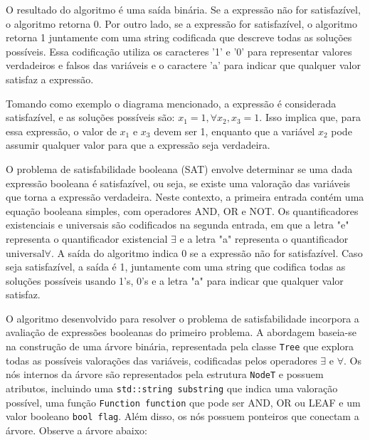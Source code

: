 \documentclass{article}
\begin{document}
O resultado do algoritmo é uma saída binária. Se a expressão não for satisfazível, o algoritmo retorna 0. Por outro lado, se a expressão for satisfazível, o algoritmo retorna 1 juntamente com uma string codificada que descreve todas as soluções possíveis. Essa codificação utiliza os caracteres '1' e '0' para representar valores verdadeiros e falsos das variáveis e o caractere 'a' para indicar que qualquer valor satisfaz a expressão.

Tomando como exemplo o diagrama mencionado, a expressão é considerada satisfazível, e as soluções possíveis são: $x_1=1, \forall x_2, x_3=1$. Isso implica que, para essa expressão, o valor de $x_1$ e $x_3$ devem ser 1, enquanto que a variável $x_2$ pode assumir qualquer valor para que a expressão seja verdadeira.


O problema de satisfabilidade booleana (SAT) envolve determinar se uma dada expressão booleana é satisfazível, ou seja, se existe uma valoração das variáveis que torna a expressão verdadeira. Neste contexto, a primeira entrada contém uma equação booleana simples, com operadores AND, OR e NOT. Os quantificadores existenciais e universais são codificados na segunda entrada, em que a letra "e" representa o quantificador existencial $\exists$ e a letra "a" representa o quantificador universal$ \forall$. A saída do algoritmo indica 0 se a expressão não for satisfazível. Caso seja satisfazível, a saída é 1, juntamente com uma string que codifica todas as soluções possíveis usando 1's, 0's e a letra "a" para indicar que qualquer valor satisfaz.

O algoritmo desenvolvido para resolver o problema de satisfabilidade incorpora a avaliação de expressões booleanas do primeiro problema. A abordagem baseia-se na construção de uma árvore binária, representada pela classe \texttt{Tree} que explora todas as possíveis valorações das variáveis, codificadas pelos operadores $\exists$ e $\forall$. Os nós internos da árvore são representados pela estrutura \texttt{NodeT} e possuem atributos, incluindo uma \texttt{std::string substring} que indica uma valoração possível, uma função \texttt{Function function} que pode ser AND, OR ou LEAF e um valor booleano \texttt{bool flag}. Além disso, os nós possuem ponteiros que conectam a árvore. Observe a árvore abaixo:


\begin{center}
\end{center}
\end{document}
